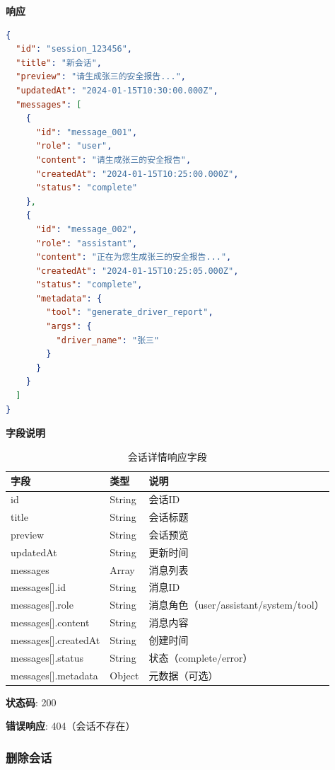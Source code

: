 \documentclass[12pt,a4paper]{article}
\begin{document}
\textbf{响应}

\begin{lstlisting}[language=json]
{
  "id": "session_123456",
  "title": "新会话",
  "preview": "请生成张三的安全报告...",
  "updatedAt": "2024-01-15T10:30:00.000Z",
  "messages": [
    {
      "id": "message_001",
      "role": "user",
      "content": "请生成张三的安全报告",
      "createdAt": "2024-01-15T10:25:00.000Z",
      "status": "complete"
    },
    {
      "id": "message_002",
      "role": "assistant",
      "content": "正在为您生成张三的安全报告...",
      "createdAt": "2024-01-15T10:25:05.000Z",
      "status": "complete",
      "metadata": {
        "tool": "generate_driver_report",
        "args": {
          "driver_name": "张三"
        }
      }
    }
  ]
}
\end{lstlisting}

\textbf{字段说明}

\begin{table}[h]
  \centering
  \begin{tabular}{lll}
    \toprule
    字段 & 类型 & 说明 \\
    \midrule
    id & String & 会话ID \\
    title & String & 会话标题 \\
    preview & String & 会话预览 \\
    updatedAt & String & 更新时间 \\
    messages & Array & 消息列表 \\
    messages[].id & String & 消息ID \\
    messages[].role & String & 消息角色（user/assistant/system/tool） \\
    messages[].content & String & 消息内容 \\
    messages[].createdAt & String & 创建时间 \\
    messages[].status & String & 状态（complete/error） \\
    messages[].metadata & Object & 元数据（可选） \\
    \bottomrule
  \end{tabular}
  \caption{会话详情响应字段}
\end{table}

\textbf{状态码}: 200

\textbf{错误响应}: 404（会话不存在）

\subsubsection{删除会话}
\end{document}
